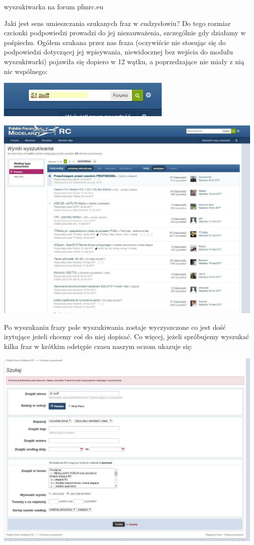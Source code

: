 \documentclass{article}
\begin{document}
\begin{enumerate}
\begin{center}
\caption{wyszukiwarka na forum pfmrc.eu}
\end{center}
Jaki jest sens umieszczania szukanych fraz w cudzysłowiu?  Do tego rozmiar czcionki podpowiedzi prowadzi do jej niezauważenia, szczególnie gdy działamy w pośpiechu.
Ogółem szukana przez nas fraza (oczywiście nie stosując się do podpowiedzi dotyczącej jej wpisywania, niewidocznej bez wejścia do modułu wyszukiwarki)  pojawiła się dopiero w 12 wątku, a poprzedzające nie miały z nią nic wspólnego:
\begin{center}
\includegraphics[width=\textwidth]{2}
\end{center}
\begin{center}
\includegraphics[width=\textwidth]{3}
\end{center}
\newpage Po wyszukaniu frazy pole wyszukiwania zostaje wyczyszczone co jest dość irytujące jeżeli chcemy coś do niej dopisać.
Co więcej, jeżeli spróbujemy wyszukać kilka fraz w krótkim odstępie czasu naszym oczom ukazuje się:
\begin{center}
\includegraphics[width=\textwidth]{4}

\end{center}
\end{enumerate}
\end{document}

